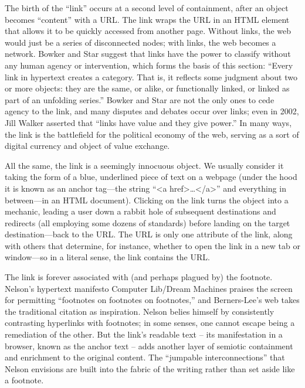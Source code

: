 The birth of the “link” occurs at a second level of containment, after an object becomes “content” with a URL. The link wraps the URL in an HTML element that allows it to be quickly accessed from another page. Without links, the web would just be a series of disconnected nodes; with links, the web becomes a network. Bowker and Star suggest that links have the power to classify without any human agency or intervention, which forms the basis of this section: “Every link in hypertext creates a category. That is, it reflects some judgment about two or more objects: they are the same, or alike, or functionally linked, or linked as part of an unfolding series.”  Bowker and Star are not the only ones to cede agency to the link, and many disputes and debates occur over links; even in 2002, Jill Walker asserted that “links have value and they give power.”  In many ways, the link is the battlefield for the political economy of the web, serving as a sort of digital currency and object of value exchange.

All the same, the link is a seemingly innocuous object. We usually consider it taking the form of a blue, underlined piece of text on a webpage (under the hood it is known as an anchor tag—the string “<a href>…</a>” and everything in between—in an HTML document). Clicking on the link turns the object into a mechanic, leading a user down a rabbit hole of subsequent destinations and redirects (all employing some dozens of standards) before landing on the target destination—back to the URL. The URL is only one attribute of the link, along with others that determine, for instance, whether to open the link in a new tab or window—so in a literal sense, the link contains the URL.

The link is forever associated with (and perhaps plagued by) the footnote. Nelson’s hypertext manifesto Computer Lib/Dream Machines praises the screen for permitting “footnotes on footnotes on footnotes,”  and Berners-Lee’s web takes the traditional citation as inspiration. Nelson belies himself by consistently contrasting hyperlinks with footnotes; in some senses, one cannot escape being a remediation of the other. But the link’s readable text – its manifestation in a browser, known as the anchor text – adds another layer of semiotic containment and enrichment to the original content. The “jumpable interconnections” that Nelson envisions are built into the fabric of the writing rather than set aside like a footnote.

